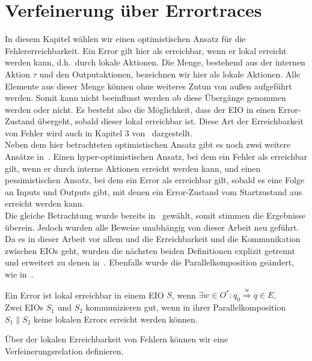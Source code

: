 \chapter{Verfeinerung über Errortraces}

In diesem Kapitel wählen wir einen optimistischen Ansatz für die
Fehlererreichbarkeit. Ein Error gilt hier als erreichbar, wenn er lokal
erreicht werden kann, d.h.\ durch lokale Aktionen. Die Menge, bestehend aus der
internen Aktion $\tau$ und den Outputaktionen, bezeichnen wir hier als lokale
Aktionen. Alle Elemente aus dieser Menge können ohne
weiteres Zutun von außen aufgeführt werden. Somit kann nicht beeinflusst werden ob diese
Übergänge genommen werden oder nicht. Es besteht also die Möglichkeit, dass
der EIO in einen Error-Zustand übergeht, sobald dieser lokal erreichbar ist. Diese
Art der Erreichbarkeit von Fehler wird auch in Kapitel 3 von~\cite{Vogler2014EIO}
dargestellt.\\
Neben dem hier betrachteten optimistischen Ansatz gibt es noch zwei weitere
Ansätze in~\cite{Vogler2014EIO}. Einen hyper-optimistischen Ansatz, bei dem ein
Fehler als erreichbar gilt, wenn er durch interne Aktionen erreicht werden
kann, und einen pessimistischen Ansatz, bei dem ein Error als erreichbar gilt,
sobald es eine Folge an Inputs und Outputs gibt, mit denen ein Error-Zustand
vom Startzustand aus erreicht werden kann.\\
Die gleiche Betrachtung wurde bereits in~\cite{Schlosser2012BA} gewählt, somit
stimmen die Ergebnisse überein. Jedoch wurden alle Beweise unabhängig von
dieser Arbeit neu geführt.\\
Da es in dieser Arbeit vor allem und die Erreichbarkeit und die Kommunikation
zwischen EIOs geht, wurden die nächsten beiden Definitionen explizit getrennt
und erweitert zu denen in~\cite{Vogler2014EIO}. Ebenfalls wurde die
Parallelkomposition geändert, wie in~\cite{Schlosser2012BA}.

\begin{Def}
  Ein Error ist lokal erreichbar in einem EIO $S$, wenn $\exists w\in O^*: q_0
  \overset{w}{\Rightarrow} q\in E$.\\
  Zwei EIOs $S_1$ und $S_2$ kommunizieren gut, wenn in ihrer
  Parallelkomposition $S_1\| S_2$ keine lokalen Errors erreicht werden können.
\end{Def}

Über der lokalen Erreichbarkeit von Fehlern können wir eine
Verfeinerungsrelation definieren.

